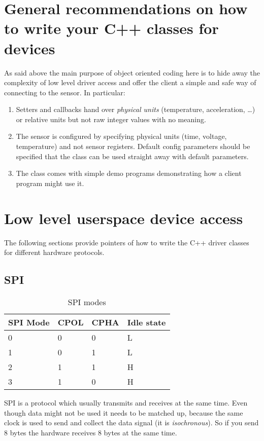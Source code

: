 \documentclass[12pt]{report}
\begin{document}
\section{General recommendations on how to write your C++ classes for devices}
As said above the main purpose of object oriented coding here is to
hide away the complexity of low level driver access and offer the
client a simple and safe way of connecting to the sensor. In
particular:
\begin{enumerate}
\item Setters and callbacks hand over \textsl{physical units}
  (temperature, acceleration, \ldots) or relative units but not raw
  integer values with no meaning.
\item The sensor is configured by specifying physical units (time,
  voltage, temperature) and not sensor registers. Default config parameters
  should be specified that the class can be used straight away with
  default parameters.
\item The class comes with simple demo programs demonstrating how
  a client program might use it.
\end{enumerate}

\section{Low level userspace device access}
The following sections provide pointers of how to write
the C++ driver classes for different hardware protocols.

\subsection{SPI}
\begin{table}[!ht]
  \begin{center}
  \caption{SPI modes\label{spimodes}}
  \begin{tabular}{l|l|l|l}
    SPI Mode & 	CPOL & 	CPHA & Idle state \\
    \hline
    0& 	0&	0& 	L \\
    1& 	0&	1& 	L \\
    2& 	1&	1& 	H \\
    3& 	1&	0& 	H \\
  \end{tabular}
  \end{center}
\end{table}
SPI is a protocol which usually transmits and receives at the same
time. Even though data might not be used it needs to be matched up,
because the same clock is used to send and collect the data signal
(it is \emph{isochronous}).
So if you send 8 bytes the hardware receives 8 bytes at the same time.
\end{document}
